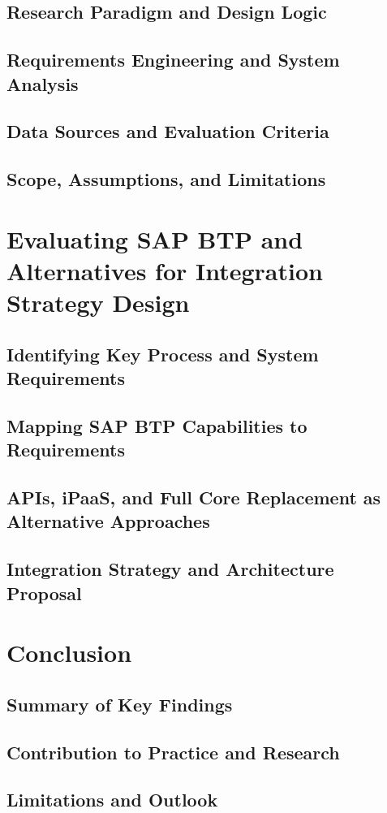 \subsection{Research Paradigm and Design Logic}
\subsection{Requirements Engineering and System Analysis}
\subsection{Data Sources and Evaluation Criteria}
\subsection{Scope, Assumptions, and Limitations}
\newpage

\section{Evaluating SAP BTP and Alternatives for Integration Strategy Design}
\subsection{Identifying Key Process and System Requirements}
\subsection{Mapping SAP BTP Capabilities to Requirements}
\subsection{APIs, iPaaS, and Full Core Replacement as Alternative Approaches}
\subsection{Integration Strategy and Architecture Proposal}
\newpage

\section{Conclusion}
\subsection*{Summary of Key Findings}
\subsection*{Contribution to Practice and Research}
\subsection*{Limitations and Outlook}
\newpage
